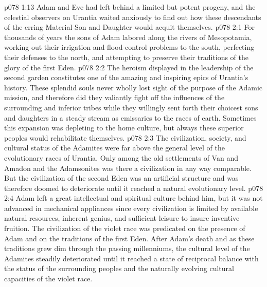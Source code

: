 \vs p078 1:13 Adam and Eve had left behind a limited but potent progeny, and the celestial observers on Urantia waited anxiously to find out how these descendants of the erring Material Son and Daughter would acquit themselves.
\vs p078 2:1 For thousands of years the sons of Adam labored along the rivers of Mesopotamia, working out their irrigation and flood\hyp{}control problems to the south, perfecting their defenses to the north, and attempting to preserve their traditions of the glory of the first Eden.
\vs p078 2:2 The heroism displayed in the leadership of the second garden constitutes one of the amazing and inspiring epics of Urantia’s history. These splendid souls never wholly lost sight of the purpose of the Adamic mission, and therefore did they valiantly fight off the influences of the surrounding and inferior tribes while they willingly sent forth their choicest sons and daughters in a steady stream as emissaries to the races of earth. Sometimes this expansion was depleting to the home culture, but always these superior peoples would rehabilitate themselves.
\vs p078 2:3 The civilization, society, and cultural status of the Adamites were far above the general level of the evolutionary races of Urantia. Only among the old settlements of Van and Amadon and the Adamsonites was there a civilization in any way comparable. But the civilization of the second Eden was an artificial structure  and was therefore doomed to deteriorate until it reached a natural evolutionary level.
\vs p078 2:4 Adam left a great intellectual and spiritual culture behind him, but it was not advanced in mechanical appliances since every civilization is limited by available natural resources, inherent genius, and sufficient leisure to insure inventive fruition. The civilization of the violet race was predicated on the presence of Adam and on the traditions of the first Eden. After Adam’s death and as these traditions grew dim through the passing millenniums, the cultural level of the Adamites steadily deteriorated until it reached a state of reciprocal balance with the status of the surrounding peoples and the naturally evolving cultural capacities of the violet race.
